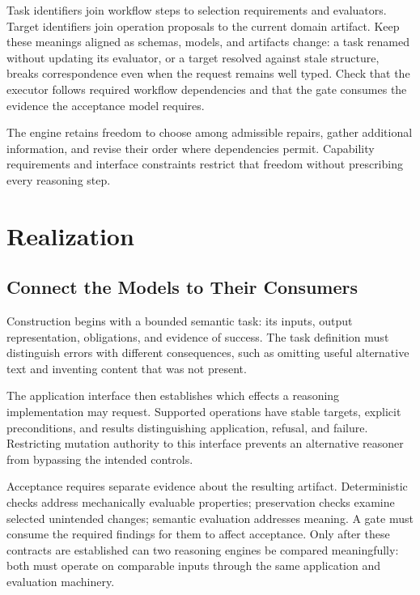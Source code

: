 Task identifiers join workflow steps to selection requirements and evaluators. Target identifiers join operation proposals to the current domain artifact. Keep these meanings aligned as schemas, models, and artifacts change: a task renamed without updating its evaluator, or a target resolved against stale structure, breaks correspondence even when the request remains well typed. Check that the executor follows required workflow dependencies and that the gate consumes the evidence the acceptance model requires.

The engine retains freedom to choose among admissible repairs, gather additional information, and revise their order where dependencies permit. Capability requirements and interface constraints restrict that freedom without prescribing every reasoning step.

\section{Realization}\label{heading:realization}

\subsection*{Connect the Models to Their Consumers}\label{heading:connect-the-models-to-their-consumers}

Construction begins with a bounded semantic task: its inputs, output representation, obligations, and evidence of success. The task definition must distinguish errors with different consequences, such as omitting useful alternative text and inventing content that was not present.

The application interface then establishes which effects a reasoning implementation may request. Supported operations have stable targets, explicit preconditions, and results distinguishing application, refusal, and failure. Restricting mutation authority to this interface prevents an alternative reasoner from bypassing the intended controls.

Acceptance requires separate evidence about the resulting artifact. Deterministic checks address mechanically evaluable properties; preservation checks examine selected unintended changes; semantic evaluation addresses meaning. A gate must consume the required findings for them to affect acceptance. Only after these contracts are established can two reasoning engines be compared meaningfully: both must operate on comparable inputs through the same application and evaluation machinery.

